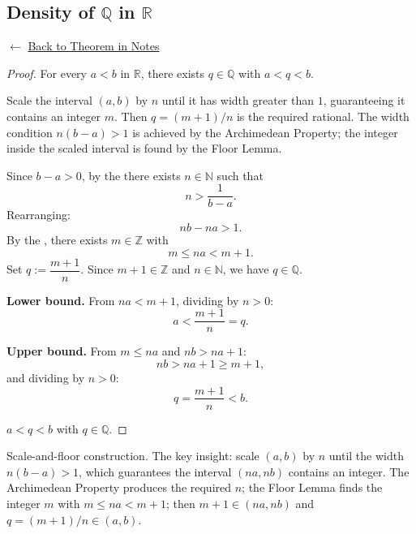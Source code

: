 
\subsection*{Density of $\mathbb{Q}$ in $\mathbb{R}$}
\label{prf:density-of-rationals}

\begin{remark*}[Return]
$\leftarrow$ \hyperref[thm:density-of-rationals]{Back to Theorem in Notes}
\end{remark*}

\begin{proof}
\Claim For every $a < b$ in $\mathbb{R}$, there exists $q \in \mathbb{Q}$
with $a < q < b$.

\Strategy
Scale the interval $(a,b)$ by $n$ until it has width greater than $1$,
guaranteeing it contains an integer $m$.
Then $q = (m+1)/n$ is the required rational.
The width condition $n(b-a) > 1$ is achieved by the Archimedean Property;
the integer inside the scaled interval is found by the Floor Lemma.

\medskip
Since $b - a > 0$, by the  there exists
$n \in \mathbb{N}$ such that
\[
  n > \frac{1}{b-a}.
\]
Rearranging:
\[
  nb - na > 1.
\]
By the , there exists $m \in \mathbb{Z}$ with
\[
  m \leq na < m+1.
\]
Set $q := \dfrac{m+1}{n}$.
Since $m+1 \in \mathbb{Z}$ and $n \in \mathbb{N}$, we have $q \in \mathbb{Q}$.

\medskip
\textbf{Lower bound.}
From $na < m+1$, dividing by $n > 0$:
\[
  a < \frac{m+1}{n} = q.
\]

\medskip
\textbf{Upper bound.}
From $m \leq na$ and $nb > na + 1$:
\[
  nb > na + 1 \geq m + 1,
\]
and dividing by $n > 0$:
\[
  q = \frac{m+1}{n} < b.
\]

\Hence $a < q < b$ with $q \in \mathbb{Q}$. \AsReq
\end{proof}

\begin{remark*}
Scale-and-floor construction.
The key insight: scale $(a,b)$ by $n$ until the width $n(b-a) > 1$,
which guarantees the interval $(na,nb)$ contains an integer.
The Archimedean Property produces the required $n$;
the Floor Lemma finds the integer $m$ with $m \leq na < m+1$;
then $m+1 \in (na,nb)$ and $q = (m+1)/n \in (a,b)$.

\end{remark*}

